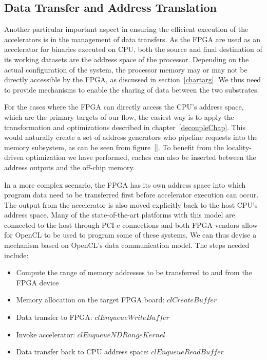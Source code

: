 \subsection{Data Transfer and Address Translation}
\label{dtransfer}
Another particular important aspect in ensuring the efficient execution of the accelerators is in the management of data transfers. %
As the FPGA are used as an accelerator for binaries executed on CPU, both the source
and final destination of its working datasets are the address space of
the processor. Depending on the actual configuration of the system, the processor memory may or may not be directly accessible by the FPGA, as discussed in section~\ref{chartarg}. We thus need to provide mechanisms to enable
the sharing of data between the two substrates.


For the cases where the FPGA can directly access the 
CPU's address space, which are the primary targets of our flow, the easiest way is to apply the transformation and
optimizations described in chapter~\ref{decoupleChap}. This would
naturally create a set of address generators who pipeline requests into the 
memory subsystem, as can be seen from figure~\ref{}. To benefit from the locality-driven optimization we 
have performed, caches can also be inserted between the address outputs and the
off-chip memory. 

In a more complex scenario, the FPGA has its own address space into which program data need to be transferred first before accelerator execution can occur. The output from the accelerator
is also moved explicitly back to the host CPU's address space.
Many of the state-of-the-art platforms with this model
are connected to the host through PCI-e connections and both FPGA vendors allow for
OpenCL to be used to program some of these systems. We can thus devise
a mechanism based on OpenCL's data communication model. 
The steps needed include: 
\begin{itemize}
    \item Compute the range of memory addresses to be transferred to and from the FPGA device
    \item Memory allocation on the target FPGA board: $clCreateBuffer$ 
    \item Data transfer to FPGA: $clEnqueueWriteBuffer$
    \item Invoke accelerator: $clEnqueueNDRangeKernel$
    \item Data transfer back to CPU address space: $clEnqueueReadBuffer$
\end{itemize} 

